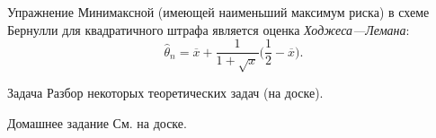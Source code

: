 \begin{frame}{Упражнение}
    Минимаксной (имеющей наименьший максимум риска) в схеме Бернулли для квадратичного штрафа
является оценка \textit{Ходжеса—Лемана}:
$$
\hat{\theta}_n
= \overline{x}+
\frac{1}{1+\sqrt{x}}
\bigg(
{\frac{1}{2} - \overline{x}}
\bigg).
$$
\end{frame}
%
\begin{frame}{Задача}
    Разбор некоторых теоретических задач (на доске).
\end{frame}

\begin{frame}{Домашнее задание}
    См. на доске.
\end{frame}
%
%
%
%
%
%
%
%
%
%
%



